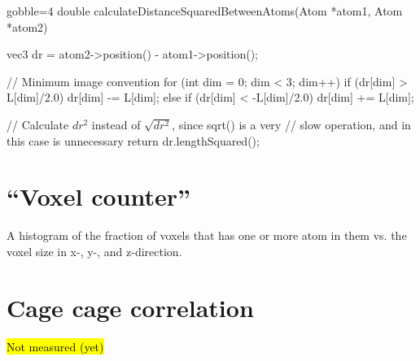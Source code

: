 \begin{listing}[!htb]%
\begin{cppcode*}{gobble=4}
    double calculateDistanceSquaredBetweenAtoms(Atom *atom1, Atom *atom2)
    {
        vec3 dr = atom2->position() - atom1->position();
        
        // Minimum image convention
        for (int dim = 0; dim < 3; dim++)
        {
            if      (dr[dim] >  L[dim]/2.0) dr[dim] -= L[dim];
            else if (dr[dim] < -L[dim]/2.0) dr[dim] += L[dim];
        }
        
        // Calculate $dr^2$ instead of $\sqrt{dr^2}$, since sqrt() is a very 
        // slow operation, and in this case is unnecessary
        return dr.lengthSquared();
    }
\end{cppcode*}
\caption{%
    \texttt{calculateDistanceSquaredBetweenAtoms}%
    \label{list:calculateDistanceSquaredBetweenAtoms}%
}%
\end{listing}%


\FloatBarrier
\section{``Voxel counter''}
    A histogram of the fraction of voxels that has one or more atom in them vs. the voxel size in x-, y-, and z-direction.
    
\FloatBarrier
\section{Cage cage correlation}
    \hl{Not measured (yet)}

\FloatBarrier

